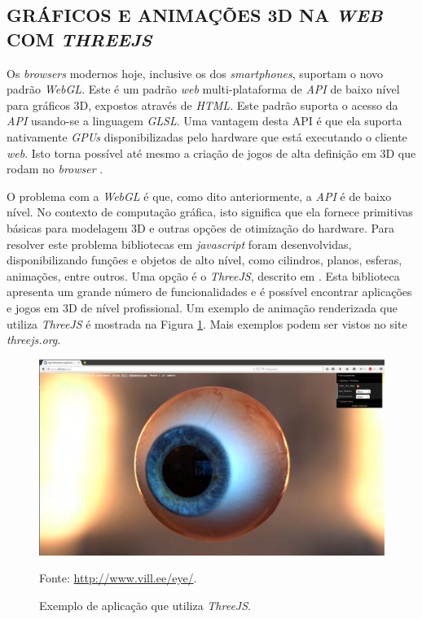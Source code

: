 \subsection{GRÁFICOS E ANIMAÇÕES 3D NA \emph{WEB} COM \emph{THREEJS}} 
\label{threejs_sec}
Os \emph{browsers} modernos hoje, inclusive os dos \emph{smartphones}, suportam o novo padrão \emph{WebGL}. 
Este é um padrão \emph{web} multi-plataforma de \emph{API} de baixo nível para gráficos 3D, expostos através de \emph{HTML}. 
Este padrão suporta o acesso da \emph{API} usando-se a linguagem \emph{GLSL}. 
Uma vantagem desta API é que ela suporta nativamente \emph{GPUs} disponibilizadas pelo hardware que está executando o cliente \emph{web}. 
Isto torna possível até mesmo a criação de jogos de alta definição em 3D que rodam no \emph{browser} \cite{Matsuda2013}.

O problema com a \emph{WebGL} é que, como dito anteriormente, a \emph{API} é de baixo nível. 
No contexto de computação gráfica, isto significa que ela fornece primitivas básicas para modelagem 3D e outras opções de otimização do hardware.
Para resolver este problema bibliotecas em \emph{javascript} foram desenvolvidas, disponibilizando funções e objetos de alto nível, como cilindros, planos, esferas, animações, entre outros. 
Uma opção é o \emph{ThreeJS}, descrito em . 
Esta biblioteca apresenta um grande número de funcionalidades e é possível encontrar aplicações e jogos em 3D de nível profissional. 
Um exemplo de animação renderizada que utiliza \emph{ThreeJS} é mostrada na Figura \ref{evil_eye}.
Mais exemplos podem ser vistos no site \emph{threejs.org}.



\begin{figure}[ht]
	\centering
	\includegraphics[width=14cm]{figuras/evil_eye.eps}
	\caption{Exemplo de aplicação que utiliza \emph{ThreeJS}.}
	\label{evil_eye}
	\footnotesize Fonte: \url{http://www.vill.ee/eye/}.
\end{figure}



